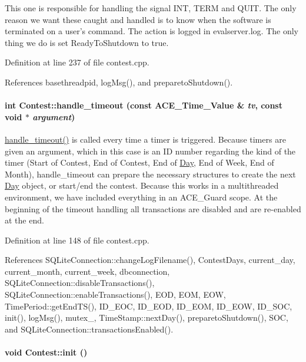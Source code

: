This one is responsible for handling the signal INT, TERM and QUIT. The only reason we want these caught and handled is to know when the software is terminated on a user's command. The action is logged in evalserver.log. The only thing we do is set Ready\-To\-Shutdown to true. 

Definition at line 237 of file contest.cpp.

References basethreadpid, log\-Msg(), and prepareto\-Shutdown().\hypertarget{classContest_Contesta5}{
\paragraph[handle\_\-timeout]{\setlength{\rightskip}{0pt plus 5cm}int Contest::handle\_\-timeout (const ACE\_\-Time\_\-Value \& {\em tv}, const void $\ast$ {\em argument})}\hfill}
\label{classContest_Contesta5}


\hyperlink{classContest_Contesta5}{handle\_\-timeout()} is called every time a timer is triggered. Because timers are given an argument, which in this case is an ID number regarding the kind of the timer (Start of Contest, End of Contest, End of \hyperlink{classDay}{Day}, End of Week, End of Month), handle\_\-timeout can prepare the necessary structures to create the next \hyperlink{classDay}{Day} object, or start/end the contest. Because this works in a multithreaded environment, we have included everything in an ACE\_\-Guard scope. At the beginning of the timeout handling all transactions are disabled and are re-enabled at the end. 

Definition at line 148 of file contest.cpp.

References SQLite\-Connection::change\-Log\-Filename(), Contest\-Days, current\_\-day, current\_\-month, current\_\-week, dbconnection, SQLite\-Connection::disable\-Transactions(), SQLite\-Connection::enable\-Transactions(), EOD, EOM, EOW, Time\-Period::get\-End\-TS(), ID\_\-EOC, ID\_\-EOD, ID\_\-EOM, ID\_\-EOW, ID\_\-SOC, init(), log\-Msg(), mutex\_\-, Time\-Stamp::next\-Day(), prepareto\-Shutdown(), SOC, and SQLite\-Connection::transactions\-Enabled().\hypertarget{classContest_Contesta2}{
\paragraph[init]{\setlength{\rightskip}{0pt plus 5cm}void Contest::init ()}\hfill}
\label{classContest_Contesta2}


